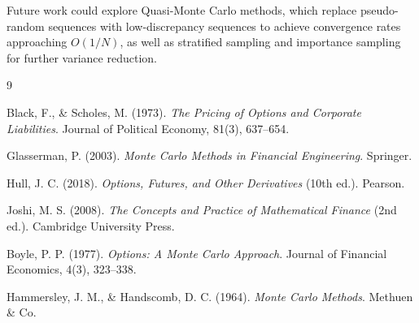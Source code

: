 \documentclass[12pt]{article}
\begin{document}
Future work could explore Quasi-Monte Carlo methods, which replace
pseudo-random sequences with low-discrepancy sequences to achieve
convergence rates approaching $O(1/N)$, as well as stratified sampling
and importance sampling for further variance reduction.

\begin{thebibliography}{9}

Black, F., \& Scholes, M. (1973).
\textit{The Pricing of Options and Corporate Liabilities}.
Journal of Political Economy, 81(3), 637--654.

Glasserman, P. (2003).
\textit{Monte Carlo Methods in Financial Engineering}.
Springer.

Hull, J. C. (2018).
\textit{Options, Futures, and Other Derivatives} (10th ed.).
Pearson.

Joshi, M. S. (2008).
\textit{The Concepts and Practice of Mathematical Finance} (2nd ed.).
Cambridge University Press.

Boyle, P. P. (1977).
\textit{Options: A Monte Carlo Approach}.
Journal of Financial Economics, 4(3), 323--338.

Hammersley, J. M., \& Handscomb, D. C. (1964).
\textit{Monte Carlo Methods}.
Methuen \& Co.

\end{thebibliography}
\end{document}
